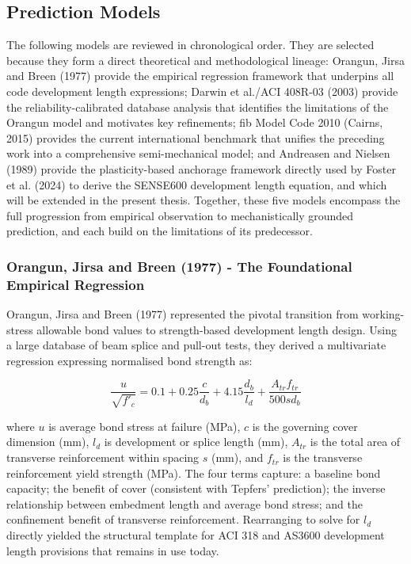 \subsection{Prediction Models}
The following models are reviewed in chronological order. They are selected because they form a direct theoretical and methodological lineage: Orangun, Jirsa and Breen (1977) provide the empirical regression framework that underpins all code development length expressions; Darwin et al./ACI 408R-03 (2003) provide the reliability-calibrated database analysis that identifies the limitations of the Orangun model and motivates key refinements; fib Model Code 2010 (Cairns, 2015) provides the current international benchmark that unifies the preceding work into a comprehensive semi-mechanical model; and Andreasen and Nielsen (1989) provide the plasticity-based anchorage framework directly used by Foster et al. (2024) to derive the SENSE600 development length equation, and which will be extended in the present thesis. Together, these five models encompass the full progression from empirical observation to mechanistically grounded prediction, and each build on the limitations of its predecessor.

\subsubsection{Orangun, Jirsa and Breen (1977) - The Foundational Empirical Regression}
Orangun, Jirsa and Breen (1977) represented the pivotal transition from working-stress allowable bond values to strength-based development length design. Using a large database of beam splice and pull-out tests, they derived a multivariate regression expressing normalised bond strength as:

\begin{equation}
\frac{u}{\sqrt{f'_c}} = 0.1 + 0.25\frac{c}{d_b} + 4.15\frac{d_b}{l_d} + \frac{A_{tr}f_{tr}}{500 s d_b}
\end{equation}

where $u$ is average bond stress at failure (MPa), $c$ is the governing cover dimension (mm), $l_{d}$ is development or splice length (mm), $A_{tr}$ is the total area of transverse reinforcement within spacing $s$ (mm), and $f_{tr}$ is the transverse reinforcement yield strength (MPa). The four terms capture: a baseline bond capacity; the benefit of cover (consistent with Tepfers' prediction); the inverse relationship between embedment length and average bond stress; and the confinement benefit of transverse reinforcement. Rearranging to solve for $l_d$ directly yielded the structural template for ACI 318 and AS3600 development length provisions that remains in use today.

